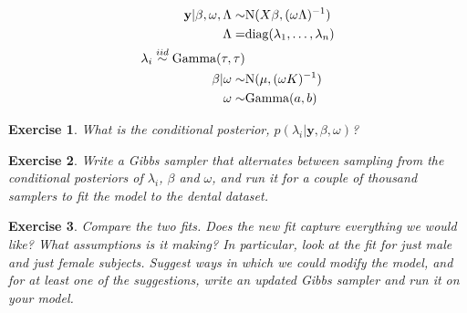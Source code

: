 \documentclass[twoside]{article}
\newcounter{lecnum}
\newtheorem{exercise}{Exercise}[lecnum]
\begin{document}
$$\begin{aligned}
  \mathbf{y}|\beta,\omega,\Lambda \sim& \mbox{N}(X\beta, (\omega \Lambda)^{-1})\\
  \Lambda =& \mbox{diag}(\lambda_1,\dots, \lambda_n)\\
  \lambda_i \stackrel{\small{iid}}{\sim} \mbox{Gamma}(\tau,\tau)\\
  \beta|\omega \sim& \mbox{N}(\mu, (\omega K)^{-1})\\
  \omega \sim& \mbox{Gamma}(a,b)
\end{aligned}$$

\begin{exercise}
  What is the conditional posterior, $p(\lambda_i|\mathbf{y},\beta, \omega)$?
\end{exercise}

\begin{exercise}
  Write a Gibbs sampler that alternates between sampling from the conditional posteriors of $\lambda_i$, $\beta$ and $\omega$, and run it for a couple of thousand samplers to fit the model to the dental dataset. 
\end{exercise}

\begin{exercise}
  Compare the two fits. Does the new fit capture everything we would like? What assumptions is it making? In particular, look at the fit for just male and just female subjects. Suggest ways in which we could modify the model, and for at least one of the suggestions, write an updated Gibbs sampler and run it on your model.
\end{exercise}
  
  
\end{document}
